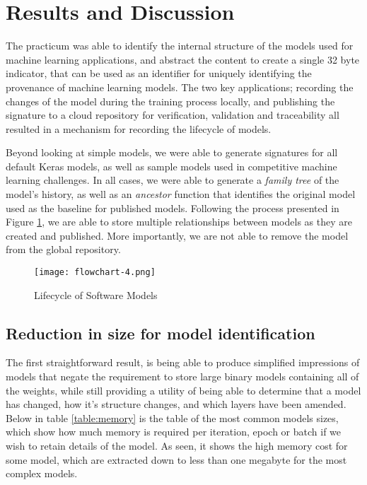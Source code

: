 \section{Results and Discussion}

The practicum was able to identify the internal structure of the models used for machine learning applications, and abstract the content to create a single 32 byte indicator, that can be used as an identifier for uniquely identifying the provenance of machine learning models. The two key applications; recording the changes of the model during the training process locally, and publishing the signature to a cloud repository for verification, validation and traceability all resulted in a mechanism for recording the lifecycle of models.

Beyond looking at simple models, we were able to generate signatures for all default Keras models, as well as sample models used in competitive machine learning challenges. In all cases, we were able to generate a \textit{family tree} of the model's history, as well as an \textit{ancestor} function that identifies the original model used as the baseline for published models. Following the process presented in Figure \ref{fig:lifecycleModels}, we are able to store multiple relationships between models as they are created and published. More importantly, we are not able to remove the model from the global repository.

\begin{figure}[!t]
    \centering
    \texttt{[image: flowchart-4.png]}
    \caption{Lifecycle of Software Models}
    \label{fig:lifecycleModels}
\end{figure}

\subsection{Reduction in size for model identification}
The first straightforward result, is being able to produce simplified impressions of models that negate the requirement to store large binary models containing all of the weights, while still providing a utility of being able to determine that a model has changed, how it's structure changes, and which layers have been amended. Below in table \ref{table:memory} is the table of the most common models sizes, which show how much memory is required per iteration, epoch or batch if we wish to retain details of the model. As seen, it shows the high memory cost for some model, which are extracted down to less than one megabyte for the most complex models.

